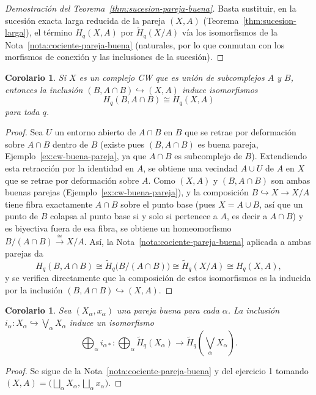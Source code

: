 \documentclass[11pt,a4paper]{article}
\theoremstyle{plain}
\newtheorem{corollary}[theorem]{Corolario}
\theoremstyle{definition}
\theoremstyle{remark}
\begin{document}
\begin{proof}[Demostración del Teorema~\ref{thm:sucesion-pareja-buena}]
Basta sustituir, en la sucesión exacta larga reducida de la pareja
$(X,A)$ (Teorema~\ref{thm:sucesion-larga}), el término $H_q(X,A)$ por
$\tilde H_q(X/A)$ vía los isomorfismos de la Nota~\ref{nota:cociente-pareja-buena}
(naturales, por lo que conmutan con los morfismos de conexión y las
inclusiones de la sucesión).
\end{proof}

\begin{corollary}
\label{cor:union-subcomplejos}
Si $X$ es un complejo CW que es unión de subcomplejos $A$ y $B$, entonces
la inclusión $(B,A\cap B)\hookrightarrow(X,A)$ induce isomorfismos
\[
H_q(B,A\cap B)\cong H_q(X,A)
\]
para toda $q$.
\end{corollary}

\begin{proof}
Sea $U$ un entorno abierto de $A\cap B$ en $B$ que se retrae por
deformación sobre $A\cap B$ dentro de $B$ (existe pues $(B,A\cap B)$ es
buena pareja, Ejemplo~\ref{ex:cw-buena-pareja}, ya que $A\cap B$ es
subcomplejo de $B$). Extendiendo esta retracción por la identidad en
$A$, se obtiene una vecindad $A\cup U$ de $A$ en $X$ que se retrae por
deformación sobre $A$. Como $(X,A)$ y $(B,A\cap B)$ son ambas buenas
parejas (Ejemplo~\ref{ex:cw-buena-pareja}), y la composición
$B\hookrightarrow X\to X/A$ tiene fibra exactamente $A\cap B$ sobre el
punto base (pues $X=A\cup B$, así que un punto de $B$ colapsa al punto
base si y solo si pertenece a $A$, es decir a $A\cap B$) y es biyectiva
fuera de esa fibra, se obtiene un homeomorfismo
$B/(A\cap B)\xrightarrow{\cong}X/A$. Así, la
Nota~\ref{nota:cociente-pareja-buena} aplicada a ambas parejas da
\[
H_q(B,A\cap B)\cong\tilde H_q\big(B/(A\cap B)\big)\cong\tilde H_q(X/A)\cong H_q(X,A),
\]
y se verifica directamente que la composición de estos isomorfismos es la
inducida por la inclusión $(B,A\cap B)\hookrightarrow(X,A)$.
\end{proof}

\begin{corollary}
\label{cor:homologia-bouquet}
Sea $(X_\alpha,x_\alpha)$ una pareja buena para cada $\alpha$. La inclusión
$i_\alpha:X_\alpha\hookrightarrow\bigvee_\alpha X_\alpha$ induce un
isomorfismo
\[
\bigoplus_\alpha i_{\alpha*}:\bigoplus_\alpha\tilde H_q(X_\alpha)\to\tilde H_q\left(\bigvee_\alpha X_\alpha\right).
\]
\end{corollary}

\begin{proof}
Se sigue de la Nota~\ref{nota:cociente-pareja-buena} y del ejercicio 1
tomando $(X,A)=\big(\bigsqcup_\alpha X_\alpha,\bigsqcup_\alpha x_\alpha\big)$.
\end{proof}
\end{document}
